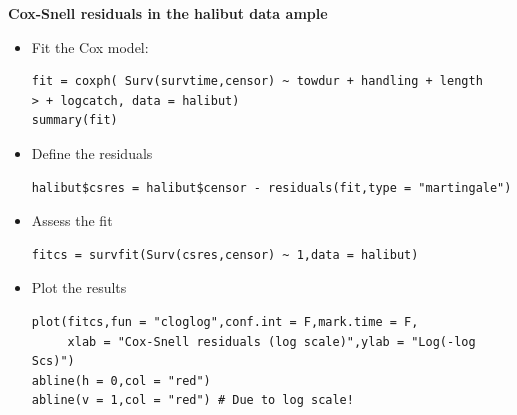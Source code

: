 \documentclass[11pt]{book}
\begin{document}
{\bf Cox-Snell residuals in the halibut data ample}
\begin{itemize}
\item Fit the Cox model:
\vspace*{-.1in}
\small
\begin{verbatim}
fit = coxph( Surv(survtime,censor) ~ towdur + handling + length
> + logcatch, data = halibut)
summary(fit)

\end{verbatim}
\normalsize
\vspace*{-.2in}
\item Define the residuals
\vspace*{-.2in}
\small
\begin{verbatim}
halibut$csres = halibut$censor - residuals(fit,type = "martingale")

\end{verbatim}
\normalsize
\vspace*{-.2in}
\item Assess the fit
\vspace*{-.2in}
\small
\begin{verbatim}
fitcs = survfit(Surv(csres,censor) ~ 1,data = halibut)
\end{verbatim}
\normalsize
\item Plot the results
\small
\begin{verbatim}
plot(fitcs,fun = "cloglog",conf.int = F,mark.time = F,
     xlab = "Cox-Snell residuals (log scale)",ylab = "Log(-log Scs)")
abline(h = 0,col = "red")
abline(v = 1,col = "red") # Due to log scale!
\end{verbatim}
\end{itemize}
\end{document}
